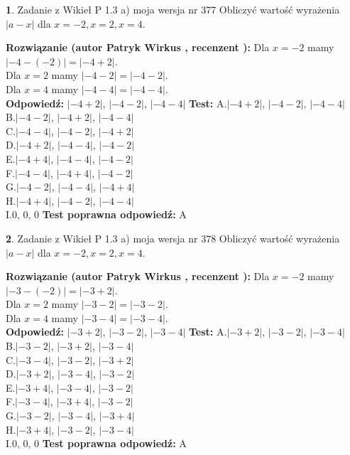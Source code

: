 \documentclass[12pt, a4paper]{article}
\theoremstyle{definition} %
\newtheorem{zad}{}
\newcommand{\zadStart}[1]{\begin{zad}#1\newline}
\newcommand{\zadStop}{\end{zad}}
\newcommand{\rozwStart}[2]{\noindent \textbf{Rozwiązanie (autor #1 , recenzent #2): }\newline}
\newcommand{\rozwStop}{\newline}
\newcommand{\odpStart}{\noindent \textbf{Odpowiedź:}\newline}
\newcommand{\odpStop}{\newline}
\newcommand{\testStart}{\noindent \textbf{Test:}\newline}
\newcommand{\testStop}{\newline}
\newcommand{\kluczStart}{\noindent \textbf{Test poprawna odpowiedź:}\newline}
\newcommand{\kluczStop}{\newline}
\begin{document}
\zadStart{Zadanie z Wikieł P 1.3 a) moja wersja nr 377}
Obliczyć wartość wyrażenia $|a - x|$ dla $x=-2,x=2,x=4$.
\zadStop
\rozwStart{Patryk Wirkus}{}
Dla $x = -2$ mamy $|-4 - (-2)| = |-4 + 2|$.\\
Dla $x = 2$ mamy $|-4 - 2| = |-4 - 2|$.\\
Dla $x = 4$ mamy $|-4 - 4| = |-4 - 4|$.\\
\rozwStop
\odpStart
$|-4 + 2|$, $|-4 - 2|$, $|-4 - 4|$
\odpStop
\testStart
A.$|-4 + 2|$, $|-4 - 2|$, $|-4 - 4|$\\
B.$|-4 - 2|$, $|-4 + 2|$, $|-4 - 4|$\\
C.$|-4 - 4|$, $|-4 - 2|$, $|-4 + 2|$\\
D.$|-4 + 2|$, $|-4 - 4|$, $|-4 - 2|$\\
E.$|-4 + 4|$, $|-4 - 4|$, $|-4 - 2|$\\
F.$|-4 - 4|$, $|-4 + 4|$, $|-4 - 2|$\\
G.$|-4 - 2|$, $|-4 - 4|$, $|-4 + 4|$\\
H.$|-4 + 4|$, $|-4 - 2|$, $|-4 - 4|$\\
I.$0$, $0$, $0$
\testStop
\kluczStart
A
\kluczStop



\zadStart{Zadanie z Wikieł P 1.3 a) moja wersja nr 378}
Obliczyć wartość wyrażenia $|a - x|$ dla $x=-2,x=2,x=4$.
\zadStop
\rozwStart{Patryk Wirkus}{}
Dla $x = -2$ mamy $|-3 - (-2)| = |-3 + 2|$.\\
Dla $x = 2$ mamy $|-3 - 2| = |-3 - 2|$.\\
Dla $x = 4$ mamy $|-3 - 4| = |-3 - 4|$.\\
\rozwStop
\odpStart
$|-3 + 2|$, $|-3 - 2|$, $|-3 - 4|$
\odpStop
\testStart
A.$|-3 + 2|$, $|-3 - 2|$, $|-3 - 4|$\\
B.$|-3 - 2|$, $|-3 + 2|$, $|-3 - 4|$\\
C.$|-3 - 4|$, $|-3 - 2|$, $|-3 + 2|$\\
D.$|-3 + 2|$, $|-3 - 4|$, $|-3 - 2|$\\
E.$|-3 + 4|$, $|-3 - 4|$, $|-3 - 2|$\\
F.$|-3 - 4|$, $|-3 + 4|$, $|-3 - 2|$\\
G.$|-3 - 2|$, $|-3 - 4|$, $|-3 + 4|$\\
H.$|-3 + 4|$, $|-3 - 2|$, $|-3 - 4|$\\
I.$0$, $0$, $0$
\testStop
\kluczStart
A
\kluczStop
\end{document}
